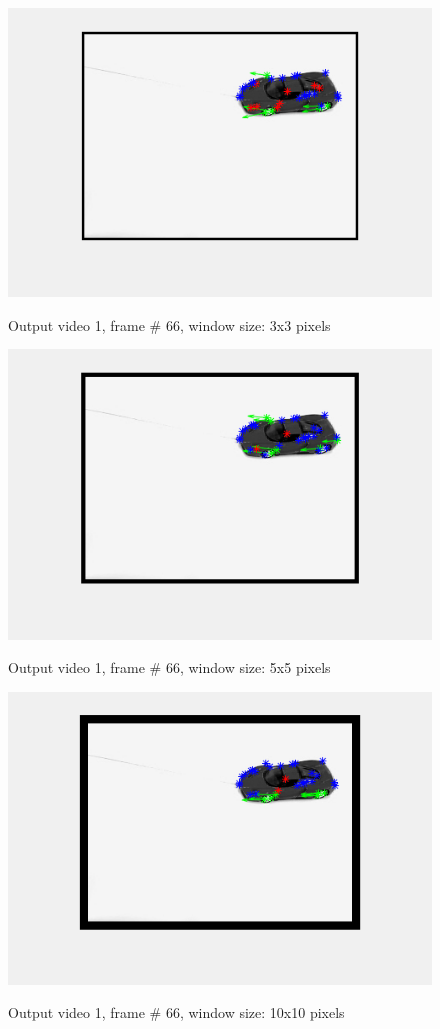 \documentclass[11pt]{article}
\begin{document}
\begin{figure}[H]
	\centering
	{\includegraphics[width=12cm]{images/out_1_66_w3x3.png} }
    \caption{Output video 1, frame \# 66, window size: 3x3 pixels}
    \label{fig:out1_2}
\end{figure}

\begin{figure}[H]
	\centering
	{\includegraphics[width=12cm]{images/out_1_66_w5x5.png} }
    \caption{Output video 1, frame \# 66, window size: 5x5 pixels}
    \label{fig:out1_3}
\end{figure}

\begin{figure}[H]
	\centering
	{\includegraphics[width=12cm]{images/out_1_66_w10x10.png} }
    \caption{Output video 1, frame \# 66, window size: 10x10 pixels}
    \label{fig:out1_4}
\end{figure}
\end{document}
